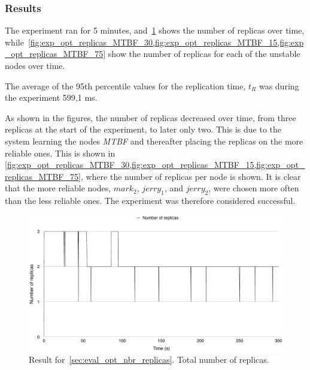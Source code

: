 \documentclass{cslthse-msc}
\begin{document}
\subsubsection*{Results}
The experiment ran for 5 minutes, and~\cref{fig:exp_opt_replicas_total} shows the number of replicas over time, while~\cref{fig:exp_opt_replicas_MTBF_30,fig:exp_opt_replicas_MTBF_15,fig:exp_opt_replicas_MTBF_75} show the number of replicas for each of the unstable nodes over time.

The average of the 95th percentile values for the replication time, $t_R$ was during the experiment 599,1 ms.

As shown in the figures, the number of replicas decreased over time, from three replicas at the start of the experiment, to later only two. This is due to the system learning the nodes \emph{MTBF} and thereafter placing the replicas on the more reliable ones. This is shown in \cref{fig:exp_opt_replicas_MTBF_30,fig:exp_opt_replicas_MTBF_15,fig:exp_opt_replicas_MTBF_75}, where the number of replicas per node is shown. It is clear that the more reliable nodes, $mark_2$, $jerry_1$, and $jerry_2$, were chosen more often than the less reliable ones. The experiment was therefore considered successful.

\begin{figure}[!hbt]
\centering
\includegraphics[scale=0.5]{images/results/optimal_replicas/total.pdf}
\caption[Total number of replicas in~\cref{sec:eval_opt_nbr_replicas}]{Result for~\cref{sec:eval_opt_nbr_replicas}. Total number of replicas.} \label{fig:exp_opt_replicas_total}
\end{figure}
\end{document}
